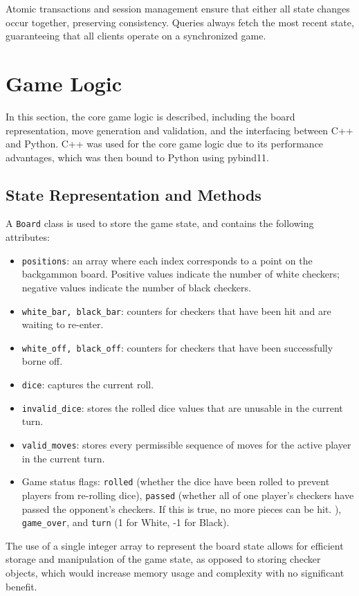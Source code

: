 Atomic transactions and session management ensure that either all state changes occur together, preserving consistency. Queries always fetch the most recent state, guaranteeing that all clients operate on a synchronized game.

\section{Game Logic}
In this section, the core game logic is described, including the board representation, move generation and validation, and the interfacing between C++ and Python. C++ was used for the core game logic due to its performance advantages, which was then bound to Python using pybind11. 
\subsection{State Representation and Methods}
A \texttt{Board} class is used to store the game state, and contains the following attributes:
\begin{itemize}
\item \texttt{positions}: an array where each index corresponds to a point on the backgammon board. Positive values indicate the number of white checkers; negative values indicate the number of black checkers.
\item \texttt{white\_bar, black\_bar}: counters for checkers that have been hit and are waiting to re-enter.
\item \texttt{white\_off, black\_off}: counters for checkers that have been successfully borne off.
\item \texttt{dice}: captures the current roll.
\item \texttt{invalid\_dice}: stores the rolled dice values that are unusable in the current turn.
\item \texttt{valid\_moves}: stores every permissible sequence of moves for the active player in the current turn.
\item Game status flags: \texttt{rolled} (whether the dice have been rolled to prevent players from re-rolling dice), \texttt{passed} (whether all of one player's checkers have passed the opponent's checkers.  If this is true, no more pieces can be hit. ), \texttt{game\_over}, and \texttt{turn} (1 for White, -1 for Black).
\end{itemize}
The use of a single integer array to represent the board state allows for efficient storage and manipulation of the game state, as opposed to storing checker objects, which would increase memory usage and complexity with no significant benefit.

